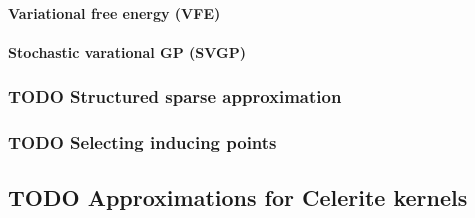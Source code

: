 \paragraph{Variational free energy (VFE) \cite{vfe}}

\paragraph{Stochastic varational GP (SVGP) \cite{svgp}}

\subsubsection{TODO Structured sparse approximation}

\subsubsection{TODO Selecting inducing points}


% 
% 
% 


\subsection{TODO Approximations for Celerite kernels \cite{foreman-mackay}}


% 
% 
% 
% 
% 
